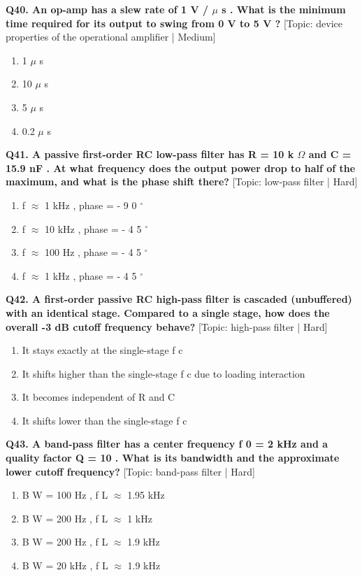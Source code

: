 \noindent\textbf{Q40. An op-amp has a slew rate of 1 V / $\mu$ s . What is the minimum time required for its output to swing from 0 V to 5 V ?} \hfill [Topic: device properties of the operational amplifier | Medium]
\begin{enumerate}[label=(\alph*),topsep=2pt,itemsep=1pt,partopsep=0pt,parsep=0pt]
    \item {1 $\mu$ s}
    \item {10 $\mu$ s}
    \item {5 $\mu$ s}
    \item {0.2 $\mu$ s}
\end{enumerate}
\vspace{2mm}

\noindent\textbf{Q41. A passive first-order RC low-pass filter has R = 10 k $\Omega$ and C = 15.9 nF . At what frequency does the output power drop to half of the maximum, and what is the phase shift there?} \hfill [Topic: low-pass filter | Hard]
\begin{enumerate}[label=(\alph*),topsep=2pt,itemsep=1pt,partopsep=0pt,parsep=0pt]
    \item {f $\approx$ 1 kHz , phase = - 9 0 $^\circ$}
    \item {f $\approx$ 10 kHz , phase = - 4 5 $^\circ$}
    \item {f $\approx$ 100 Hz , phase = - 4 5 $^\circ$}
    \item {f $\approx$ 1 kHz , phase = - 4 5 $^\circ$}
\end{enumerate}
\vspace{2mm}

\noindent\textbf{Q42. A first-order passive RC high-pass filter is cascaded (unbuffered) with an identical stage. Compared to a single stage, how does the overall -3 dB cutoff frequency behave?} \hfill [Topic: high-pass filter | Hard]
\begin{enumerate}[label=(\alph*),topsep=2pt,itemsep=1pt,partopsep=0pt,parsep=0pt]
    \item {It stays exactly at the single-stage f c}
    \item {It shifts higher than the single-stage f c due to loading interaction}
    \item {It becomes independent of R and C}
    \item {It shifts lower than the single-stage f c}
\end{enumerate}
\vspace{2mm}

\noindent\textbf{Q43. A band-pass filter has a center frequency f 0 = 2 kHz and a quality factor Q = 10 . What is its bandwidth and the approximate lower cutoff frequency?} \hfill [Topic: band-pass filter | Hard]
\begin{enumerate}[label=(\alph*),topsep=2pt,itemsep=1pt,partopsep=0pt,parsep=0pt]
    \item {B W = 100 Hz , f L $\approx$ 1.95 kHz}
    \item {B W = 200 Hz , f L $\approx$ 1 kHz}
    \item {B W = 200 Hz , f L $\approx$ 1.9 kHz}
    \item {B W = 20 kHz , f L $\approx$ 1.9 kHz}
\end{enumerate}
\vspace{2mm}

